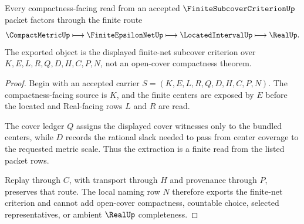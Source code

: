 \begin{theorem}
\label{thm:finite-subcover-criterion-net-extraction}
Every compactness-facing read from an accepted $\FiniteSubcoverCriterionUp$ packet factors through the finite route
$$
\CompactMetricUp \longmapsto \FiniteEpsilonNetUp \longmapsto \LocatedIntervalUp \longmapsto \RealUp .
$$
The exported object is the displayed finite-net subcover criterion over $K,E,L,R,Q,D,H,C,P,N$, not an open-cover compactness theorem.
\end{theorem}
\begin{proof}
Begin with an accepted carrier $S=(K,E,L,R,Q,D,H,C,P,N)$. The compactness-facing source is $K$, and the finite centers are exposed by $E$ before the located and Real-facing rows $L$ and $R$ are read.

The cover ledger $Q$ assigns the displayed cover witnesses only to the bundled centers, while $D$ records the rational slack needed to pass from center coverage to the requested metric scale. Thus the extraction is a finite read from the listed packet rows.

Replay through $C$, with transport through $H$ and provenance through $P$, preserves that route. The local naming row $N$ therefore exports the finite-net criterion and cannot add open-cover compactness, countable choice, selected representatives, or ambient $\RealUp$ completeness.
\end{proof}

